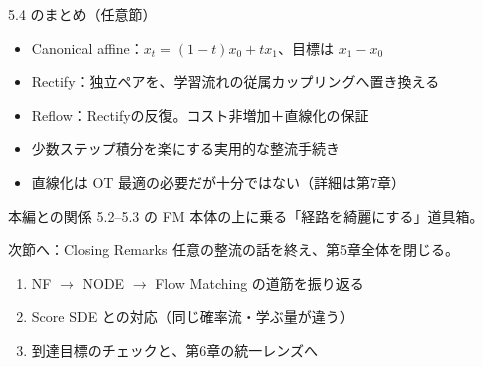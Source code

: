 \asmain
\begin{frame}{5.4 のまとめ（任意節）}
    \begin{itemize}
        \item Canonical affine：$x_t=(1-t)x_0+tx_1$、目標は $x_1-x_0$
        \item Rectify：独立ペアを、学習流れの従属カップリングへ置き換える
        \item Reflow：Rectifyの反復。コスト非増加＋直線化の保証
        \item 少数ステップ積分を楽にする実用的な整流手続き
        \item 直線化は OT 最適の必要だが十分ではない（詳細は第7章）
    \end{itemize}
    \begin{block}{本編との関係}
        5.2--5.3 の FM 本体の上に乗る「経路を綺麗にする」道具箱。
    \end{block}
\end{frame}
\asmain
\begin{frame}{次節へ：Closing Remarks}
    任意の整流の話を終え、第5章全体を閉じる。
    \begin{enumerate}
        \item NF $\to$ NODE $\to$ Flow Matching の道筋を振り返る
        \item Score SDE との対応（同じ確率流・学ぶ量が違う）
        \item 到達目標のチェックと、第6章の統一レンズへ
    \end{enumerate}
\end{frame}
